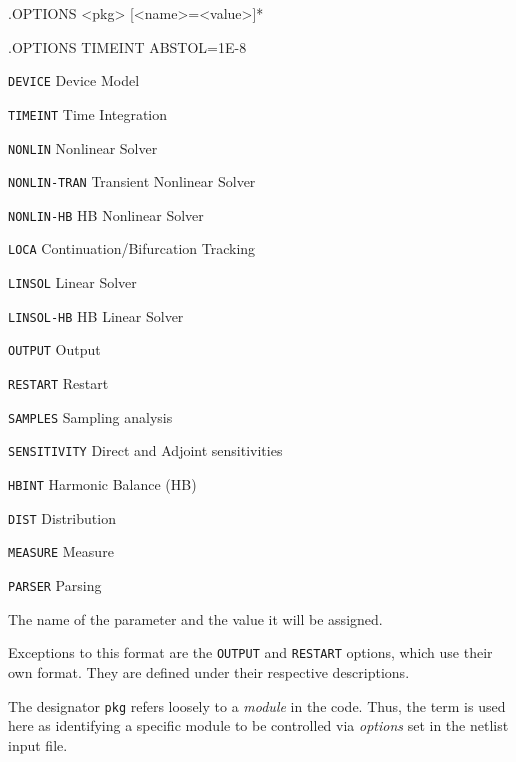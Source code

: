 \begin{Command}
\format
.OPTIONS <pkg> [<name>=<value>]*

\examples
.OPTIONS TIMEINT ABSTOL=1E-8

\arguments

\begin{Arguments}


\begin{basedescript}{
    \desclabelstyle{\multilinelabel}
    \desclabelwidth{1in}
    \renewcommand{\makelabel}[1]{\tt #1\hfill}}
  \item[\tt DEVICE]       Device Model
  \item[\tt TIMEINT]      Time Integration
  \item[\tt NONLIN]       Nonlinear Solver
  \item[\tt NONLIN-TRAN]  Transient Nonlinear Solver
  \item[\tt NONLIN-HB]    HB Nonlinear Solver
  \item[\tt LOCA]         Continuation/Bifurcation Tracking
  \item[\tt LINSOL]       Linear Solver
  \item[\tt LINSOL-HB]    HB Linear Solver
  \item[\tt OUTPUT]       Output
  \item[\tt RESTART]      Restart
  \item[\tt SAMPLES]      Sampling analysis
  \item[\tt SENSITIVITY]  Direct and Adjoint sensitivities
  \item[\tt HBINT]        Harmonic Balance (HB)
  \item[\tt DIST]         Distribution
  \item[\tt MEASURE]      Measure
  \item[\tt PARSER]       Parsing
\end{basedescript}

The name of the parameter and the value it will be assigned.

\end{Arguments}

\comments

Exceptions to this format are the \texttt{OUTPUT} and \texttt{RESTART}
options, which use their own format. They are defined under their
respective descriptions.

The designator \texttt{pkg} refers loosely to a {\em module} in the
code.  Thus, the term is used here as identifying a specific module to
be controlled via {\em options} set in the netlist input file.

\end{Command}

